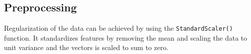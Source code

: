 \subsection{Preprocessing}%
\label{sub:preprocessing}
Regularization of the data can be achieved by using the \verb|StandardScaler()| function. It standardizes features by removing the mean and scaling the data to unit variance and the vectors is scaled to sum to zero.

